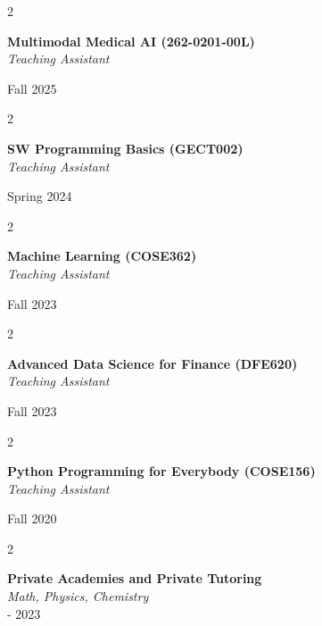 \documentclass[11pt, letterpaper]{article}
\newenvironment{twocolentry}[2][]{
    \onecolentry
    \def\secondColumn{#2}
    \setcolumnwidth{\fill, 4.8 cm}
    \begin{paracol}{2}
}{
    \switchcolumn \raggedleft \secondColumn
    \end{paracol}
    \endonecolentry
} %
\begin{document}
        \begin{twocolentry}{
            Fall 2025\\ 
        }
        \textbf{Multimodal Medical AI (262-0201-00L)} \\
        \textit{Teaching Assistant}
        \end{twocolentry}
        \vspace{0.15 cm}

        \begin{twocolentry}{
            Spring 2024\\ 
        }
        \textbf{SW Programming Basics (GECT002)} \\
        \textit{Teaching Assistant}
        \end{twocolentry}
        \vspace{0.15 cm}

        \begin{twocolentry}{
            Fall 2023\\ 
        }
        \textbf{Machine Learning (COSE362)} \\
        \textit{Teaching Assistant}
        \end{twocolentry}
        \vspace{0.15 cm}

        \begin{twocolentry}{
            Fall 2023\\ 
        }
        \textbf{Advanced Data Science for Finance (DFE620)} \\
        \textit{Teaching Assistant}
        \end{twocolentry}
        \vspace{0.15 cm}

        \begin{twocolentry}{
            Fall 2020\\ 
        }
        \textbf{Python Programming for Everybody (COSE156)} \\
        \textit{Teaching Assistant}
        \end{twocolentry}
        \vspace{0.15 cm}
        
        \begin{twocolentry}{
            2016 - 2023\\
        }
        \textbf{Private Academies and Private Tutoring} \\
        \textit{Math, Physics, Chemistry} \\
        \end{twocolentry}
    \vspace{0.15 cm}
\end{document}
